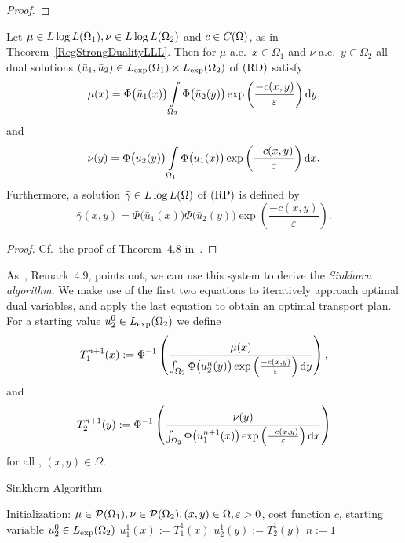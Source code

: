 \begin{proof}
\end{proof}

\begin{corollary}\label{RegOptCond}
	Let $\mu \in \LLL[\Omega_1], \nu \in \LLL[\Omega_2]$ and $c \in \CF{\Omega}$, as in Theorem~\ref{RegStrongDualityLLL}. Then for $\mu$-a.e.\ $x \in \Omega_1$ and $\nu$-a.e.\ $y \in \Omega_2$ all dual solutions $(\bar{u}_1, \bar{u}_2) \in \Lexp[\Omega_1] \times \Lexp[\Omega_2]$ of$\text{\normalfont\ (RD)}$ satisfy
	\[ \mu(x) = \Phi\big( \bar{u}_1(x) \big) \int\limits_{\Omega_2} \Phi\big( \bar{u}_2(y) \big) \exp \left( \frac{- c(x, y)}{\varepsilon} \right)\D[y], \]
	and
	\[ \nu(y) = \Phi\big( \bar{u}_2(y) \big) \int\limits_{\Omega_1} \Phi\big( \bar{u}_1(x) \big) \exp \left( \frac{- c(x, y)}{\varepsilon} \right)\D[x]. \]
	Furthermore, a solution $\bar{\gamma} \in \LLL$ of$\text{\normalfont\ (RP)}$ is defined by
	\[ \bar{\gamma}(x, y) = \Phi\big( \bar{u}_1(x) \big) \Phi\big( \bar{u}_2(y) \big) \exp\left( \frac{- c(x, y)}{\varepsilon} \right). \]
\end{corollary}

\begin{proof}
	Cf.~the proof of Theorem~4.8 in~\cite{Cla2021}.
\end{proof}

As~\cite{Cla2021}, Remark~4.9, points out, we can use this system to derive the \textit{Sinkhorn algorithm}. We make use of the first two equations to iteratively approach optimal dual variables, and apply the last equation to obtain an optimal transport plan. For a starting value $u_2^0 \in \Lexp[\Omega_2]$ we define
\[ T_1^{n + 1}(x) := \Phi^{-1} \left( \frac{\mu(x)}{\int_{\Omega_2} \Phi\big( u_2^n(y) \big) \exp\left( \frac{-c(x, y)}{\varepsilon} \right)\D[y]} \right), \]
and
\[ T_2^{n + 1}(y) := \Phi^{-1} \left( \frac{\nu(y)}{\int_{\Omega_2} \Phi\big( u_1^{n + 1}(x) \big) \exp\left( \frac{-c(x, y)}{\varepsilon} \right)\D[x]} \right) \]
for all \NinN, $(x, y) \in \Omega$.
\begin{algorithm}\label{SinkhornAlg}
	\caption{Sinkhorn Algorithm}
	Initialization: $\mu \in \PM{\Omega_1}, \nu \in \PM{\Omega_2}, (x, y) \in \Omega, \varepsilon > 0$, cost function $c$, starting variable $u_2^0 \in \Lexp[\Omega_2]$\;
	$u_1^1(x) := T_1^1(x)$\;
	$u_2^1(y) := T_2^1(y)$\;
	$n := 1$\;
\end{algorithm}

